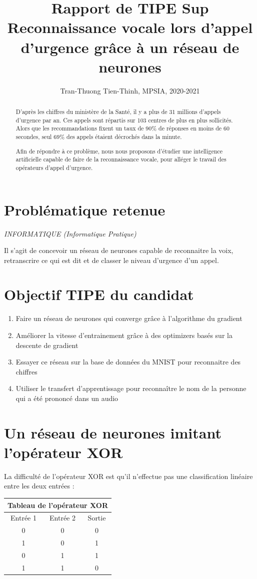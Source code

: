 \documentclass[12pt,a4paper, french]{article}
\title{Rapport de TIPE Sup \\
Reconnaissance vocale lors d'appel d'urgence grâce à un réseau de neurones}
\author{Tran-Thuong Tien-Thinh, MPSIA, 2020-2021}
\date{}
\begin{document}
\maketitle

\begin{abstract}
D'après les chiffres du ministère de la Santé, il y a plus de 31 millions d'appels d'urgence par an. Ces appels sont répartis sur 103 centres de plus en plus sollicités. Alors que les recommandations fixent un taux de 90\% de réponses en moins de 60 secondes, seul 69\% des appels étaient décrochés dans la minute.  

Afin de répondre à ce problème, nous nous proposons d'étudier une intelligence artificielle capable de faire de la reconnaissance vocale, pour alléger le travail des opérateurs d'appel d'urgence.
\end{abstract}

\section*{Problématique retenue}
\noindent\textit{INFORMATIQUE (Informatique Pratique)}

Il s’agit de concevoir un réseau de neurones capable de reconnaitre la voix, retranscrire ce qui est dit et de classer le niveau d'urgence d'un appel.

\section*{Objectif TIPE du candidat}
\begin{enumerate}
    \item Faire un réseau de neurones qui converge grâce à l’algorithme du gradient
    \item Améliorer la vitesse d'entrainement grâce à des optimizers basés sur la descente de gradient
    \item Essayer ce réseau sur la base de données du MNIST pour reconnaitre des chiffres
    \item Utiliser le transfert d'apprentissage pour reconnaître le nom de la personne qui a été prononcé dans un audio
\end{enumerate}

\section{Un réseau de neurones imitant l'opérateur XOR}
La difficulté de l'opérateur XOR est qu'il n'effectue pas une classification linéaire entre les deux entrées :
\begin{center}
\begin{tabular}{ |c|c||c|   }
 \hline
 \multicolumn{3}{|c|}{Tableau de l'opérateur XOR} \\
 \hline
 Entrée 1 & Entrée 2 & Sortie\\
 \hline
 0 & 0 & 0\\
 1 & 0 & 1\\
 0 & 1 & 1\\
 1 & 1 & 0\\
 \hline
\end{tabular}
\end{center}
\end{document}
